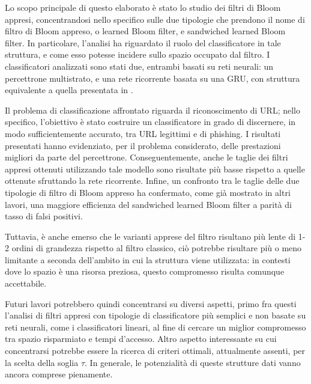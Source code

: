 \documentclass[../../main.tex]{subfiles}
\begin{document}
    Lo scopo principale di questo elaborato è stato lo studio dei filtri di Bloom appresi, concentrandosi nello specifico sulle due tipologie che prendono il nome di filtro di Bloom appreso, o learned Bloom filter, e sandwiched learned Bloom filter. In particolare, l'analisi ha riguardato il ruolo del classificatore in tale struttura, e come esso potesse incidere sullo spazio occupato dal filtro. I classificatori analizzati sono stati due, entrambi basati su reti neurali: un percettrone multistrato, e una rete ricorrente basata su una GRU, con struttura equivalente a quella presentata in \cite{ma2020}. 
    
    Il problema di classificazione affrontato riguarda il riconoscimento di URL; nello specifico, l'obiettivo è stato costruire un classificatore in grado di discernere, in modo sufficientemente accurato, tra URL legittimi e di phishing. I risultati presentati hanno evidenziato, per il problema considerato, delle prestazioni migliori da parte del percettrone. Conseguentemente, anche le taglie dei filtri appresi ottenuti utilizzando tale modello sono risultate più basse rispetto a quelle ottenute sfruttando la rete ricorrente. Infine, un confronto tra le taglie delle due tipologie di filtro di Bloom appreso ha confermato, come già mostrato in altri lavori, una maggiore efficienza del sandwiched learned Bloom filter a parità di tasso di falsi positivi.

    Tuttavia, è anche emerso che le varianti apprese del filtro risultano più lente di 1-2 ordini di grandezza rispetto al filtro classico, ciò potrebbe risultare più o meno limitante a seconda dell'ambito in cui la struttura viene utilizzata: in contesti dove lo spazio è una risorsa preziosa, questo compromesso risulta comunque accettabile. 
    
    Futuri lavori potrebbero quindi concentrarsi su diversi aspetti, primo fra questi l'analisi di filtri appresi con tipologie di classificatore più semplici e non basate su reti neurali, come i classificatori lineari, al fine di cercare un miglior compromesso tra spazio risparmiato e tempi d'accesso. Altro aspetto interessante su cui concentrarsi potrebbe essere la ricerca di criteri ottimali, attualmente assenti, per la scelta della soglia $\tau$. In generale, le potenzialità di queste strutture dati vanno ancora comprese pienamente.
\end{document}
